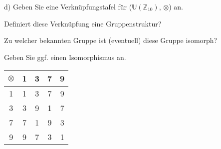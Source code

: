 d) Geben Sie eine Verknüpfungstafel für ($\mathbb{U}(\mathbb{Z}_{10})$, $\otimes$) an.\

\hspace{0.55cm}Definiert diese Verknüpfung eine Gruppenstruktur?\

\hspace{0.55cm}Zu welcher bekannten Gruppe ist (eventuell) diese Gruppe isomorph?\

\hspace{0.55cm}Geben Sie ggf. einen Isomorphismus an.\

\begin{table}[h]
\centering
\begin{tabular}{c|c|c|c|c}
$\otimes$ & 1 & 3 & 7 & 9\\
\hline
1 & 1 & 3 & 7 & 9\\
\hline
3 & 3 & 9 & 1 & 7\\
\hline
7 & 7 & 1 & 9 & 3\\
\hline
9 & 9 & 7 & 3 & 1
\end{tabular}
\end{table}
